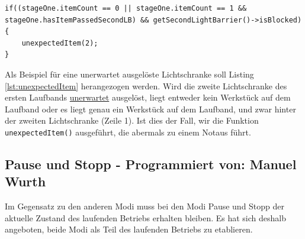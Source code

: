 \documentclass[fontsize=11pt,a4paper,final]{scrartcl}[2003/01/01]
\newcommand*{\manu}{%
	Programmiert von: Manuel Wurth
}
\begin{document}
\begin{lstlisting}[caption={Beispiel: Zweite Lichtschranke wird unerwartet ausgelöst},label={lst:unexpectedItem}]
if((stageOne.itemCount == 0 || stageOne.itemCount == 1 && stageOne.hasItemPassedSecondLB) && getSecondLightBarrier()->isBlocked)
{
	unexpectedItem(2);
}
\end{lstlisting}
Als Beispiel für eine unerwartet ausgelöste Lichtschranke soll Listing \ref{lst:unexpectedItem} herangezogen werden. Wird die zweite Lichtschranke des ersten Laufbands \underline{unerwartet} ausgelöst, liegt entweder kein Werkstück auf dem Laufband oder es liegt genau ein Werkstück auf dem Laufband, und zwar hinter der zweiten Lichtschranke (Zeile 1). Ist dies der Fall, wir die Funktion \lstinline|unexpectedItem()| ausgeführt, die abermals zu einem Notaus führt.

\subsection{Pause und Stopp - \manu}
Im Gegensatz zu den anderen Modi muss bei den Modi Pause und Stopp der aktuelle Zustand des laufenden Betriebs erhalten bleiben. Es hat sich deshalb angeboten, beide Modi als Teil des laufenden Betriebs zu etablieren.
\end{document}
